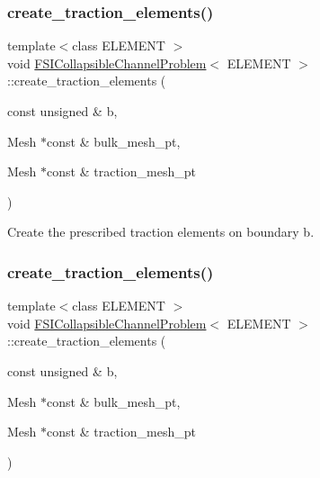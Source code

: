 \subsubsection{\texorpdfstring{create\+\_\+traction\+\_\+elements()}{create\_traction\_elements()}\hspace{0.1cm}{\footnotesize\ttfamily [3/4]}}
{\footnotesize\ttfamily template$<$class E\+L\+E\+M\+E\+NT $>$ \\
void \hyperlink{classFSICollapsibleChannelProblem}{F\+S\+I\+Collapsible\+Channel\+Problem}$<$ E\+L\+E\+M\+E\+NT $>$\+::create\+\_\+traction\+\_\+elements (\begin{DoxyParamCaption}\item[{const unsigned \&}]{b,  }\item[{Mesh $\ast$const \&}]{bulk\+\_\+mesh\+\_\+pt,  }\item[{Mesh $\ast$const \&}]{traction\+\_\+mesh\+\_\+pt }\end{DoxyParamCaption})\hspace{0.3cm}{\ttfamily [private]}}



Create the prescribed traction elements on boundary b. 

\mbox{\label{classFSICollapsibleChannelProblem_af7352e5fd5ea8965adbc9505749442a3}} 
\subsubsection{\texorpdfstring{create\+\_\+traction\+\_\+elements()}{create\_traction\_elements()}\hspace{0.1cm}{\footnotesize\ttfamily [4/4]}}
{\footnotesize\ttfamily template$<$class E\+L\+E\+M\+E\+NT $>$ \\
void \hyperlink{classFSICollapsibleChannelProblem}{F\+S\+I\+Collapsible\+Channel\+Problem}$<$ E\+L\+E\+M\+E\+NT $>$\+::create\+\_\+traction\+\_\+elements (\begin{DoxyParamCaption}\item[{const unsigned \&}]{b,  }\item[{Mesh $\ast$const \&}]{bulk\+\_\+mesh\+\_\+pt,  }\item[{Mesh $\ast$const \&}]{traction\+\_\+mesh\+\_\+pt }\end{DoxyParamCaption})\hspace{0.3cm}{\ttfamily [private]}}




